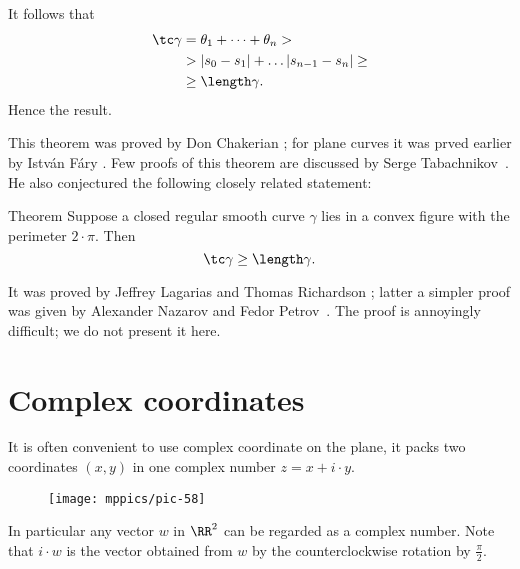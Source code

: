It follows that
\begin{align*}
\tc \gamma
&=\theta_1+\dots+\theta_n>
\\
&> |s_{0}-s_1|+\dots |s_{n-1}-s_n|\ge 
\\
&\ge\length \gamma.
\end{align*}
Hence the result.
\qeds

This theorem was proved by Don Chakerian \cite{chakerian};
for plane curves it was prved earlier by Istv\'{a}n F\'{a}ry \cite{fary-DNA}.
Few proofs of this theorem are discussed by Serge Tabachnikov~\cite{tabachnikov}.
He also conjectured the following closely related statement:

\begin{thm}{Theorem}
Suppose a closed regular smooth curve $\gamma$ lies in a convex figure with the perimeter $2\cdot \pi$.
Then 
\[\tc\gamma\ge \length\gamma.\]

\end{thm}

It was proved by Jeffrey Lagarias and Thomas Richardson \cite{lagarias-richardso}; latter a simpler proof was given by Alexander Nazarov and Fedor Petrov~\cite{nazarov-petrov}.
The proof is annoyingly difficult; we do not present it here.












\section*{Complex coordinates}

It is often convenient to use complex coordinate on the plane,
it packs two coordinates $(x,y)$ in one complex number $z=x+i\cdot y$.

{

\begin{wrapfigure}{r}{20 mm}
\vskip-0mm
\centering
\texttt{[image: mppics/pic-58]}
\vskip0mm
\end{wrapfigure}

In particular any vector $w$ in $\RR^2$ can be regarded as a complex number.
Note that $i\cdot w$ is the vector obtained from $w$ by the counterclockwise rotation by $\tfrac\pi2$.

}































